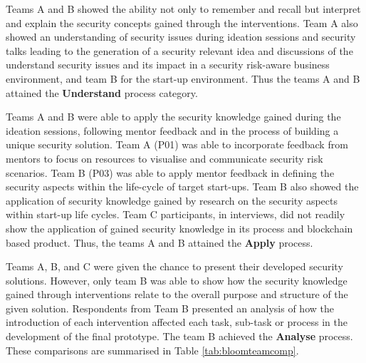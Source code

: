 \documentclass[runningheads]{llncs}
\begin{document}
Teams A and B showed the ability not only to remember and recall but interpret and explain the security concepts gained through the interventions. Team A also showed an understanding of security issues during ideation sessions and security talks leading to the generation of a security relevant idea and discussions of the understand security issues and its impact in a security risk-aware business environment, and team B for the start-up environment.  Thus the teams A and B attained the \textbf{Understand} process category.

Teams A and B were able to apply the security knowledge gained during the ideation sessions, following mentor feedback and in the process of building a unique security solution.
Team A (P01) was able to incorporate feedback from mentors to focus on resources to visualise and communicate security risk scenarios. Team B (P03) was able to apply mentor feedback in defining the security aspects within the life-cycle of target start-ups. Team B also showed the application of security knowledge gained by research on the security aspects within start-up life cycles. Team C participants, in interviews, did not readily show the application of gained security knowledge in its process and blockchain based product. Thus, the teams A and B attained the \textbf{Apply} process.

Teams A, B, and C were given the chance to present their developed security solutions. However, only team B was able to show how the security knowledge gained through interventions relate to the overall purpose and structure of the given solution. Respondents from Team B presented an analysis of how the introduction of each intervention affected each task, sub-task or process in the development of the final prototype. The team B achieved the \textbf{Analyse} process. These comparisons are summarised in Table \ref{tab:bloomteamcomp}.
\end{document}
